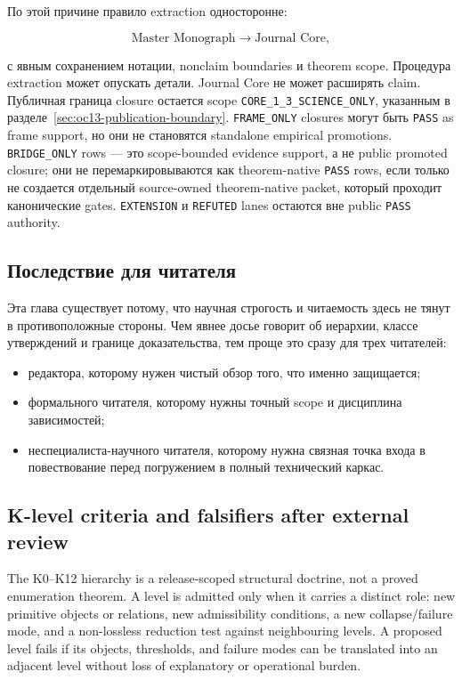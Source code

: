 По этой причине правило extraction односторонне:

\[
\text{Master Monograph} \longrightarrow \text{Journal Core},
\]

с явным сохранением нотации, nonclaim boundaries и theorem scope.
Процедура extraction может опускать детали.
Journal Core не может расширять claim.
Публичная граница closure остается scope
\texttt{CORE\_1\_3\_SCIENCE\_ONLY}, указанным в
разделе~\ref{sec:oc13-publication-boundary}. \texttt{FRAME\_ONLY}
closures могут быть \texttt{PASS} as frame support, но они не становятся
standalone empirical promotions. \texttt{BRIDGE\_ONLY} rows — это
scope-bounded evidence support, а не public promoted closure; они не
перемаркировываются как theorem-native \texttt{PASS} rows, если только не
создается отдельный source-owned theorem-native packet, который проходит
канонические gates. \texttt{EXTENSION} и \texttt{REFUTED} lanes остаются
вне public \texttt{PASS} authority.

\subsection{Последствие для читателя}

Эта глава существует потому, что научная строгость и читаемость здесь не
тянут в противоположные стороны.
Чем явнее досье говорит об иерархии, классе утверждений и границе
доказательства, тем проще это сразу для трех читателей:

\begin{itemize}
\item редактора, которому нужен чистый обзор того, что именно защищается;
\item формального читателя, которому нужны точный scope и дисциплина
      зависимостей;
\item неспециалиста-научного читателя, которому нужна связная точка входа в
      повествование перед погружением в полный технический каркас.
\end{itemize}


\subsection{K-level criteria and falsifiers after external review}
\label{sec:oc13-k-level-criteria-v3}

The K0--K12 hierarchy is a release-scoped structural doctrine, not a proved
enumeration theorem. A level is admitted only when it carries a distinct role:
new primitive objects or relations, new admissibility conditions, a new
collapse/failure mode, and a non-lossless reduction test against neighbouring
levels. A proposed level fails if its objects, thresholds, and failure modes can
be translated into an adjacent level without loss of explanatory or operational
burden.

